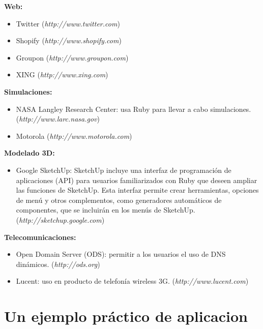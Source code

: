 \documentclass{article}
\begin{document}
\textbf{Web:}
\begin{itemize}
	\itemsep=1pt \topsep=0pt \partopsep=0pt \parskip=0pt \parsep=0pt
	\item Twitter (\textit{http://www.twitter.com})
	\item Shopify (\textit{http://www.shopify.com})
	\item Groupon (\textit{http://www.groupon.com})
	\item XING (\textit{http://www.xing.com})
\end{itemize}
\medskip

\textbf{Simulaciones:}
\begin{itemize}
	\itemsep=1pt \topsep=0pt \partopsep=0pt \parskip=0pt \parsep=0pt
	\item NASA Langley Research Center: usa Ruby para llevar a cabo simulaciones. (\textit{http://www.larc.nasa.gov})
	\item Motorola (\textit{http://www.motorola.com})
\end{itemize}
\medskip

\textbf{Modelado 3D:}
\begin{itemize}
	\itemsep=1pt \topsep=0pt \partopsep=0pt \parskip=0pt \parsep=0pt
	\item Google SketchUp: SketchUp incluye una interfaz de programación de aplicaciones (API) para usuarios familiarizados con Ruby que deseen ampliar las funciones de SketchUp. Esta interfaz permite crear herramientas, opciones de menú y otros complementos, como generadores automáticos de componentes, que se incluirán en los menús de SketchUp. (\textit{http://sketchup.google.com})
\end{itemize}
\medskip

\textbf{Telecomunicaciones:}
\begin{itemize}
	\itemsep=1pt \topsep=0pt \partopsep=0pt \parskip=0pt \parsep=0pt
	\item Open Domain Server (ODS): permitir a los usuarios el uso de DNS dinámicos. (\textit{http://ods.org})
	\item Lucent: uso en producto de telefonía wireless 3G. (\textit{http://www.lucent.com})
\end{itemize}
\medskip
\bigskip




\section{Un ejemplo práctico de aplicacion}
\end{document}
